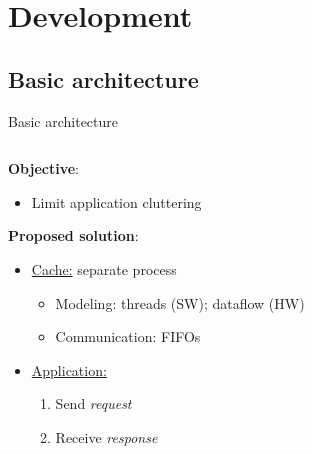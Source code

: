 \documentclass[aspectratio=169]{beamer}
\begin{document}
\section{Development}
\subsection{Basic architecture}
\begin{frame}{Basic architecture}
	\begin{columns}
		\begin{column}{.55\textwidth}
			\textbf{Objective}:
			\begin{itemize}
				\item Limit application cluttering
			\end{itemize}

			\bigskip
			\textbf{Proposed solution}:
			\begin{itemize}
				\item \underline{Cache:} separate process
					\begin{itemize}
						\item Modeling: threads (SW); dataflow (HW)
						\item Communication: FIFOs
					\end{itemize}
				\item \underline{Application:}
					\begin{enumerate}
						\item Send \emph{request}
						\item Receive \emph{response}
					\end{enumerate}
			\end{itemize}
		\end{column}
		\begin{column}{.5\textwidth}
			\begin{center}

\end{center}
\end{column}
\end{columns}
\end{frame}
\end{document}
